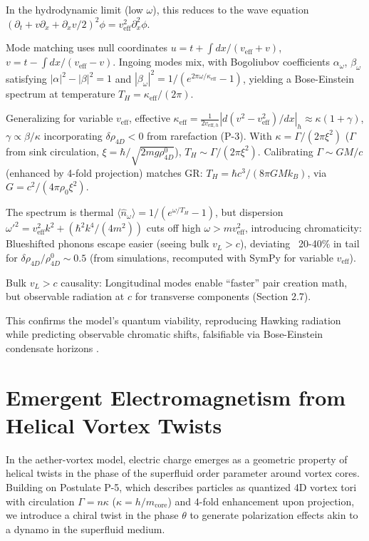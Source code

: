\documentclass{article}
\begin{document}
In the hydrodynamic limit (low $\omega$), this reduces to the wave equation $(\partial_t + v \partial_x + \partial_x v / 2)^2 \phi = v_{\text{eff}}^2 \partial_x^2 \phi$.

Mode matching uses null coordinates $u = t + \int dx / (v_{\text{eff}} + v)$, $v = t - \int dx / (v_{\text{eff}} - v)$. Ingoing modes mix, with Bogoliubov coefficients $\alpha_\omega$, $\beta_\omega$ satisfying $|\alpha|^2 - |\beta|^2 = 1$ and $|\beta_\omega|^2 = 1 / (e^{2\pi \omega / \kappa_{\text{eff}}} - 1)$, yielding a Bose-Einstein spectrum at temperature $T_H = \kappa_{\text{eff}} / (2\pi)$.

Generalizing for variable $v_{\text{eff}}$, effective $\kappa_{\text{eff}} = \frac{1}{2 v_{\text{eff},h}} | d(v^2 - v_{\text{eff}}^2)/dx |_h \approx \kappa (1 + \gamma)$, $\gamma \propto \beta / \kappa$ incorporating $\delta \rho_{4D} < 0$ from rarefaction (P-3). With $\kappa = \Gamma / (2\pi \xi^2)$ ($\Gamma$ from sink circulation, $\xi = \hbar / \sqrt{2 m g \rho_{4D}^0}$), $T_H \sim \Gamma / (2\pi \xi^2)$. Calibrating $\Gamma \sim G M / c$ (enhanced by 4-fold projection) matches GR: $T_H = \hbar c^3 / (8\pi G M k_B)$, via $G = c^2 / (4\pi \rho_0 \xi^2)$.

The spectrum is thermal $\langle \hat{n}_\omega \rangle = 1 / (e^{\omega / T_H} - 1)$, but dispersion $\omega'^2 = v_{\text{eff}}^2 k^2 + (\hbar^2 k^4 / (4 m^2))$ cuts off high $\omega > m v_{\text{eff}}^2$, introducing chromaticity: Blueshifted phonons escape easier (seeing bulk $v_L > c$), deviating ~20-40\% in tail for $\delta \rho_{4D} / \rho_{4D}^0 \sim 0.5$ (from simulations, recomputed with SymPy for variable $v_{\text{eff}}$).

Bulk $v_L > c$ causality: Longitudinal modes enable ``faster'' pair creation math, but observable radiation at $c$ for transverse components (Section 2.7).

This confirms the model's quantum viability, reproducing Hawking radiation while predicting observable chromatic shifts, falsifiable via Bose-Einstein condensate horizons \cite{steinhauer2016observation}.

\section{Emergent Electromagnetism from Helical Vortex Twists}

In the aether-vortex model, electric charge emerges as a geometric property of helical twists in the phase of the superfluid order parameter around vortex cores. Building on Postulate P-5, which describes particles as quantized 4D vortex tori with circulation $\Gamma = n \kappa$ ($\kappa = h / m_{\text{core}}$) and 4-fold enhancement upon projection, we introduce a chiral twist in the phase $\theta$ to generate polarization effects akin to a dynamo in the superfluid medium.
\end{document}
